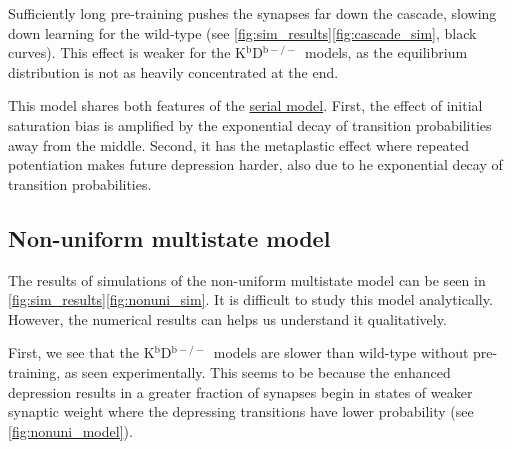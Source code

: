 \documentclass[10pt]{article}
\newcommand{\KO}{K$^\mathrm{b}$D$^{\mathrm{b}-/-}$}
\begin{document}
%

Sufficiently long pre-training pushes the synapses far down the cascade, slowing down learning for the wild-type (see \autoref{fig:sim_results}\ref{fig:cascade_sim}, black curves).
This effect is weaker for the \KO\ models, as the equilibrium distribution is not as heavily concentrated at the end.


This model shares both features of the \hyperref[sec:multistate]{serial model}.
First, the effect of initial saturation bias is amplified by the exponential decay of transition probabilities away from the middle.
Second, it has the metaplastic effect where repeated potentiation makes future depression harder, also due to he exponential decay of transition probabilities.


\subsection{Non-uniform multistate model}\label{sec:nonuni}




The results of simulations of the non-uniform multistate model can be seen in
\autoref{fig:sim_results}\ref{fig:nonuni_sim}. %
It is difficult to study this model analytically.
However, the numerical results can helps us understand it qualitatively.

First, we see that the \KO\ models are slower than wild-type without pre-training, as seen experimentally.
This seems to be because the enhanced depression results in a greater fraction of synapses begin in states of weaker synaptic weight %
where the depressing transitions have lower probability (see \autoref{fig:nonuni_model}).
\end{document}
